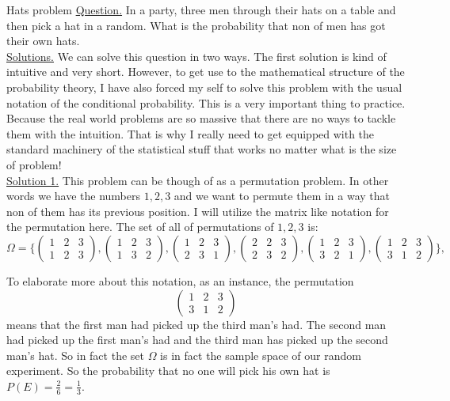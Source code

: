 \begin{example}{Hats problem}
	\underline{Question.} In a party, three men through their hats on a table and then pick a hat in a random. What is the probability that non of men has got their own hats.  \\
	
	\underline{Solutions.} We can solve this question in two ways. The first solution is kind of intuitive and very short. However, to get use to the mathematical structure of the probability theory, I have also forced my self to solve this problem with the usual notation of the conditional probability. This is a very important thing to practice. Because the real world problems are so massive that there are no ways to tackle them with the intuition. That is why I really need to get equipped with the standard machinery of the statistical stuff that works no matter what is the size of problem! \\
	
	\underline{Solution 1.} This problem can be though of as a permutation problem. In other words we have the numbers $ 1,2,3 $ and we want to permute them in a way that non of them has its previous position. I will utilize the matrix like notation for the permutation here. The set of all of permutations of $ 1,2,3 $ is:
	\[ \Omega = \{ 
	\begin{pmatrix}
		1 & 2 & 3 \\
		1 & 2 & 3
	\end{pmatrix},
	\begin{pmatrix}
		1 & 2 & 3 \\
		1 & 3 & 2
	\end{pmatrix},
	\begin{pmatrix}
		1 & 2 & 3 \\
		2 & 3 & 1
	\end{pmatrix},
	\begin{pmatrix}
		2 & 2 & 3 \\
		2 & 3 & 2
	\end{pmatrix},
	\begin{pmatrix}
		1 & 2 & 3 \\
		3 & 2 & 1
	\end{pmatrix},
	\begin{pmatrix}
		1 & 2 & 3 \\
		3 & 1 & 2
	\end{pmatrix}
	\},
	\]
	
	To elaborate more about this notation, as an instance, the permutation
	\[ \begin{pmatrix}
		1 & 2 & 3 \\
		3 & 1 & 2
	\end{pmatrix} \]
	means that the first man had picked up the third man's had. The second man had picked up the first man's had and the third man has picked up the second man's hat. So in fact the set $ \Omega $ is in fact the sample space of our random experiment. So the probability that no one will pick his own hat is $ P(E) = \frac{2}{6} = \frac{1}{3}$.
	

\end{example}

